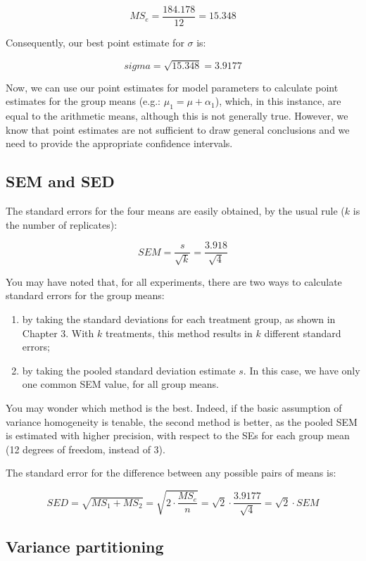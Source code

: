 \documentclass[a4paper,12pt,oneside]{book}
\providecommand{\tightlist}{%
  \setlength{\itemsep}{0pt}\setlength{\parskip}{0pt}}
\begin{document}
\[MS_{e}  = \frac{184.178}{12} = 15.348\]

Consequently, our best point estimate for \(\sigma\) is:

\[sigma =  \sqrt{15.348} = 3.9177\]

Now, we can use our point estimates for model parameters to calculate point estimates for the group means (e.g.: \(\mu_1 = \mu + \alpha_1\)), which, in this instance, are equal to the arithmetic means, although this is not generally true. However, we know that point estimates are not sufficient to draw general conclusions and we need to provide the appropriate confidence intervals.

\hypertarget{sem-and-sed}{%
\subsection{SEM and SED}\label{sem-and-sed}}

The standard errors for the four means are easily obtained, by the usual rule (\(k\) is the number of replicates):

\[SEM = \frac{s}{ \sqrt{k}} =  \frac{3.918}{ \sqrt{4}}\]

You may have noted that, for all experiments, there are two ways to calculate standard errors for the group means:

\begin{enumerate}
\def\labelenumi{\arabic{enumi}.}
\tightlist
\item
  by taking the standard deviations for each treatment group, as shown in Chapter 3. With \(k\) treatments, this method results in \(k\) different standard errors;
\item
  by taking the pooled standard deviation estimate \(s\). In this case, we have only one common SEM value, for all group means.
\end{enumerate}

You may wonder which method is the best. Indeed, if the basic assumption of variance homogeneity is tenable, the second method is better, as the pooled SEM is estimated with higher precision, with respect to the SEs for each group mean (12 degrees of freedom, instead of 3).

The standard error for the difference between any possible pairs of means is:

\[SED = \sqrt{ MS_{1} + MS_{2} } = \sqrt{ 2 \cdot \frac{MS_e}{n} } =  \sqrt{2}  \cdot \frac{3.9177}{\sqrt{4}} = \sqrt{2} \cdot SEM\]

\hypertarget{variance-partitioning}{%
\subsection{Variance partitioning}\label{variance-partitioning}}
\end{document}
